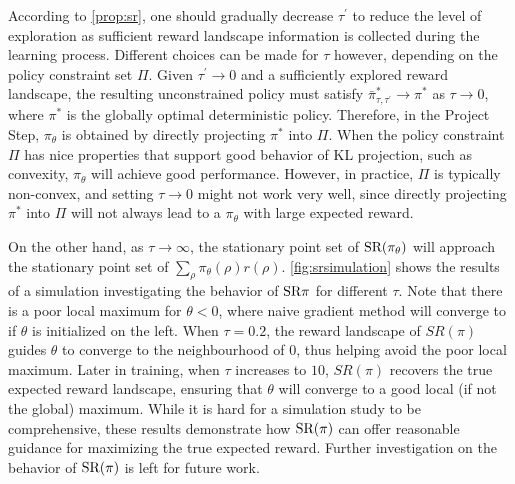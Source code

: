 According to \cref{prop:sr}, one should gradually decrease $\tau^{\prime}$
to reduce the level of exploration as sufficient reward landscape information
is collected during the learning process.
Different choices can be made for $\tau$ however,
depending on the policy constraint set $\Pi$.
Given $\tau^{\prime} \to 0$ and a sufficiently explored reward landscape,
the resulting unconstrained policy must satisfy
$\bar{\pi}_{\tau,\tau^{\prime}}^* \to \pi^*$ as $\tau \to 0$,
where $\pi^*$ is the globally optimal deterministic policy. 
Therefore, in the Project Step, $\pi_\theta$ is obtained by directly
projecting $\pi^*$ into $\Pi$.
When the policy constraint $\Pi$ has nice properties
that support good behavior of KL projection,
such as convexity,
$\pi_\theta$ will achieve good performance.
However, in practice, $\Pi$ is typically non-convex,
and setting $\tau \to 0$ might not work very well,
since directly projecting $\pi^*$ into $\Pi$ will not always lead to
a $\pi_\theta$ with large expected reward.



On the other hand, as $\tau \to \infty$,
the stationary point set of $\text{SR}(\pi_\theta)$ will approach the
stationary point set of $\sum_{\rho}{ \pi_\theta(\rho) r(\rho) }$.
\cref{fig:srsimulation} shows the results of a simulation
investigating the behavior of $\text{SR}{\pi}$ for different $\tau$.
Note that there is a poor local maximum for $\theta <0$,
where naive gradient method will converge to if $\theta$ is initialized
on the left. 
When $\tau = 0.2$, the reward landscape of $SR(\pi)$ guides
$\theta$ to converge to the neighbourhood of $0$,
thus helping avoid the poor local maximum.
Later in training, when $\tau$ increases to $10$,
$SR(\pi)$ recovers the true expected reward landscape,
ensuring that $\theta$ will converge to a good local (if not the global)
maximum.
While it is hard for a simulation study to be comprehensive,
these results demonstrate how $\text{SR}(\pi)$ can offer reasonable guidance
for maximizing the true expected reward.
Further investigation on the behavior of $\text{SR}(\pi)$
is left for future work.
 
